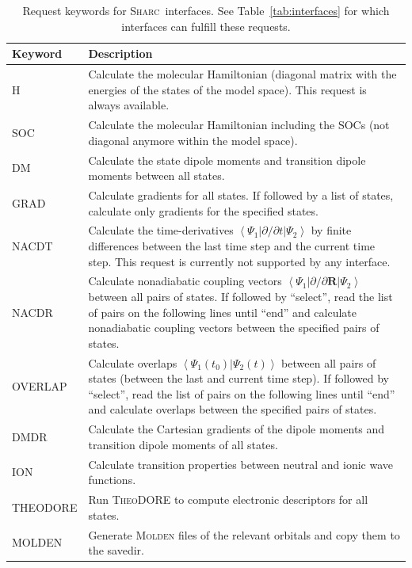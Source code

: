 \documentclass[a4paper,10pt,DIV=15,openany,twoside=false]{scrbook}
\newcommand{\sharc}{\textsc{Sharc}}
\begin{document}
\begin{table}
  \centering
  \caption{Request keywords for \sharc\ interfaces. See Table~\ref{tab:interfaces} for which interfaces can fulfill these requests.}
  \label{tab:int_req}
  \begin{tabular}{>{\ttfamily}lp{13cm}}
  \toprule
  Keyword       &Description\\
  \midrule
  H               &Calculate the molecular Hamiltonian (diagonal matrix with the energies of the states of the model space). This request is always available.\\
  SOC             &Calculate the molecular Hamiltonian including the SOCs (not diagonal anymore within the model space).\\
  DM              &Calculate the state dipole moments and transition dipole moments between all states.\\
  GRAD            &Calculate gradients for all states. If followed by a list of states, calculate only gradients for the specified states.\\
  NACDT           &Calculate the time-derivatives $\left\langle\Psi_1|\partial/\partial t|\Psi_2\right\rangle$ by finite differences between the last time step and the current time step. This request is currently not supported by any interface.\\
  NACDR           &Calculate nonadiabatic coupling vectors $\left\langle\Psi_1|\partial/\partial \mathbf{R}|\Psi_2\right\rangle$ between all pairs of states. If followed by ``select'', read the list of pairs on the following lines until ``end'' and calculate nonadiabatic coupling vectors between the specified pairs of states.\\
  OVERLAP         &Calculate overlaps $\left\langle\Psi_1(t_0)|\Psi_2(t)\right\rangle$ between all pairs of states (between the last and current time step). If followed by ``select'', read the list of pairs on the following lines until ``end'' and calculate overlaps between the specified pairs of states.\\
  DMDR            &Calculate the Cartesian gradients of the dipole moments and transition dipole moments of all states.\\
  ION             &Calculate transition properties between neutral and ionic wave functions.\\

  THEODORE        &Run \textsc{TheoDORE} to compute electronic descriptors for all states.\\
  MOLDEN          &Generate \textsc{Molden} files of the relevant orbitals and copy them to the savedir.\\
  \bottomrule
  \end{tabular}
\end{table}
\end{document}
